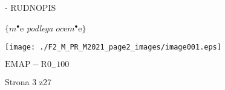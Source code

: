 \documentclass[a4paper,12pt]{article}
\begin{document}
- RUDNOPIS

$\{m^{\bullet}\mathrm{e}$ {\it podlega} $oc\mathrm{e}m^{\bullet}\mathrm{e}\}$
\begin{center}
\texttt{[image: ./F2\_M\_PR\_M2021\_page2\_images/image001.eps]}
\end{center}
$\mathrm{E}\mathrm{M}\mathrm{A}\mathrm{P}-\mathrm{R}0_{-}100$

Strona 3 z27
\end{document}
